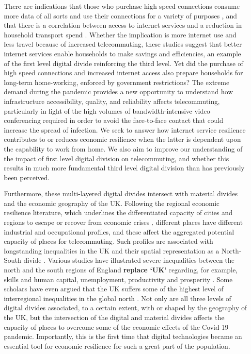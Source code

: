 \documentclass[Royal,times,sageh]{sagej}
\begin{document}
There are indications that those who purchase high speed connections
consume more data of all sorts and use their connections for a variety
of purposes \citep{hauge2011consumer}, and that there is a correlation
between access to internet services and a reduction in household
transport spend \citep{bris2017ict}. Whether the implication is more
internet use and less travel because of increased telecommuting, these
studies suggest that better internet services enable households to make
savings and efficiencies, an example of the first level digital divide
reinforcing the third level. Yet did the purchase of high speed
connections and increased internet access also prepare households for
long-term home-working, enforced by government restrictions? The extreme
demand during the pandemic provides a new opportunity to understand how
infrastructure accessibility, quality, and reliability affects
telecommuting, particularly in light of the high volumes of
bandwidth-intensive video conferencing required in order to avoid the
face-to-face contact that could increase the spread of infection. We
seek to answer how internet service resilience contributes to or reduces
economic resilience when the latter is dependent upon the capability to
work from home. We also aim to improve our understanding of the impact
of first level digital division on telecommuting, and whether this
results in much more fundamental third level digital division than has
previously been perceived.

Furthermore, these multi-layered digital divides intersect with material
divides and the economic geography of the UK. Following the regional
economic resilience literature, which underlines the differentiated
capacity of cities and regions to escape or recover from economic crises
\citep{martin2012regional, kitsos2018economic}, different places have
different industrial and occupational profiles, and these affect the
aggregated potential capacity of places for telecommuting. Such profiles
are associated with longstanding inequalities in the UK and their
spatial representation as a North-South divide
\citep{martin_north_south}. Various studies have illustrated severe
inequalities between the north and the south regions of England
\textbf{replace `UK'} regarding, for example, skills and human capital,
unemployment, productivity and prosperity
\citep{lee2014grim, mccann2020perceptions, dorling2018peak}. Some
scholars have even argued that the UK suffers some of the highest level
of interregional inequalities in the global north
\citep{gal2018reducing, mccann2016uk}. Not only are all three levels of
digital divides associated, to a certain extent, with or shaped by the
geography of the UK, but the intersection of the digital and material
divides affects the capacity of places to overcome some of the economic
effects of the Covid-19 pandemic. Importantly, this is the first time
that digital technologies became an essential tool for economic
resilience for such a great part of the population.
\end{document}
